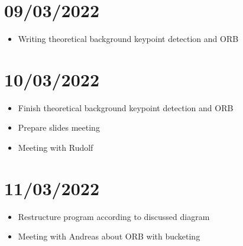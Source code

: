\section{09/03/2022}
\begin{itemize}
    \item Writing theoretical background keypoint detection and ORB
\end{itemize}

\section{10/03/2022}
\begin{itemize}
    \item Finish theoretical background keypoint detection and ORB
    \item Prepare slides meeting
    \item Meeting with Rudolf
\end{itemize}

\section{11/03/2022}
\begin{itemize}
    \item Restructure program according to discussed diagram
    \item Meeting with Andreas about ORB with bucketing
\end{itemize}


